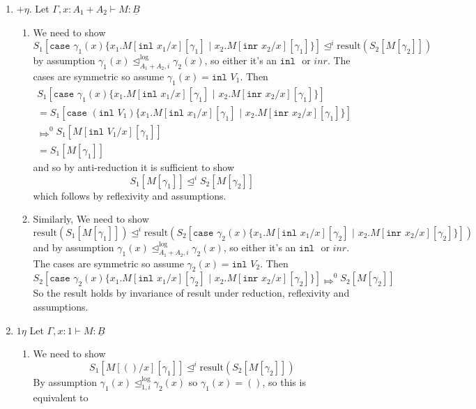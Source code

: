 \documentclass[acmsmall,nonacm]{acmart}
\renewcommand{\u}{\underline}
\newcommand{\pipe}{\,\,|\,\,}
\newcommand{\apreorder}{\trianglelefteq}
\newcommand{\ix}[2]{\mathrel{#1^{#2}}}
\newcommand{\itylrof}[3]{\ilrof{#1}{#3,#2}}
\newcommand{\ilrof}[2]{\mathrel{{#1}^{\text{log}}_{#2}}}
\newcommand{\itylr}[2]{\itylrof{\apreorder}{#1}{#2}}
\newcommand{\bigstepsin}[1]{\mathrel{\Mapsto^{#1}}}
\newcommand{\inl}{\kw{inl}}
\newcommand{\inr}{\kw{inr}}
\newcommand{\result}{\text{result}}
\newcommand{\case}{\kw{case}}
\newcommand{\kw}[1]{\texttt{#1}\,\,}
\newcommand{\caseofXthenYelseZ}[3]{\case #1 \{ #2 \pipe #3 \}}
\begin{document}
{\begin{longproof}
\begin{enumerate}
\begin{enumerate}
      By assumption $\gamma_1(x) \itylr i 0 \gamma_2(x)$ but this is a contradiction
    \item Other direction is the same contradiction.
    \end{enumerate}
  \item $+\eta$. Let $\Gamma , x:A_1 + A_2 \vdash M : \u B$
    \begin{enumerate}
    \item We need to show
      \[ S_1[\caseofXthenYelseZ {\gamma_1(x)} {x_1. M[\inl x_1/x][\gamma_1]}{x_2. M[\inr x_2/x][\gamma_1]}]
      \ix\apreorder i \result(S_2[M[\gamma_2]]) \] by assumption
      $\gamma_1(x) \itylr i {A_1 + A_2} \gamma_2(x)$, so either it's
      an $\inl$ or $inr$. The cases are symmetric so assume
      $\gamma_1(x) = \inl V_1$.
      Then
      \begin{align*}
         S_1[\caseofXthenYelseZ {\gamma_1(x)} {x_1. M[\inl x_1/x][\gamma_1]}{x_2. M[\inr x_2/x][\gamma_1]}]\\
         =S_1[\caseofXthenYelseZ {(\inl V_1)} {x_1. M[\inl x_1/x][\gamma_1]}{x_2. M[\inr x_2/x][\gamma_1]}]\\
         \bigstepsin{0} S_1[M[\inl V_1/x][\gamma_1]]\\
         = S_1[M[\gamma_1]]
      \end{align*}
      and so by anti-reduction it is sufficient to show
      \[ S_1[M[\gamma_1]] \ix\apreorder i S_2[M[\gamma_2]]\]
      which follows by reflexivity and assumptions.
    \item Similarly, We need to show
      \[
      \result(S_1[M[\gamma_1]])
      \ix\apreorder i
      \result(S_2[\caseofXthenYelseZ {\gamma_2(x)} {x_1. M[\inl x_1/x][\gamma_2]}{x_2. M[\inr x_2/x][\gamma_2]}])
      \]
      and by assumption $\gamma_1(x) \itylr i {A_1 + A_2}
      \gamma_2(x)$, so either it's an $\inl$ or $inr$. The cases are
      symmetric so assume $\gamma_2(x) = \inl V_2$.
      Then
      \[ S_2[\caseofXthenYelseZ {\gamma_2(x)} {x_1. M[\inl x_1/x][\gamma_2]}{x_2. M[\inr x_2/x][\gamma_2]}] \bigstepsin{0}
      S_2[M[\gamma_2]]
      \]
      So the result holds by invariance of result under reduction,
      reflexivity and assumptions.
    \end{enumerate}
  \item $1\eta$ Let $\Gamma, x : 1 \vdash M : \u B$
    \begin{enumerate}
    \item We need to show
      \[ S_1[M[()/x][\gamma_1]] \ix\apreorder i \result(S_2[M[\gamma_2]])\]
      By assumption $\gamma_1(x) \itylr i 1 \gamma_2(x)$ so $\gamma_1(x) = ()$, so this is equivalent to 

\end{enumerate}
\end{enumerate}
\end{longproof}}
\end{document}
